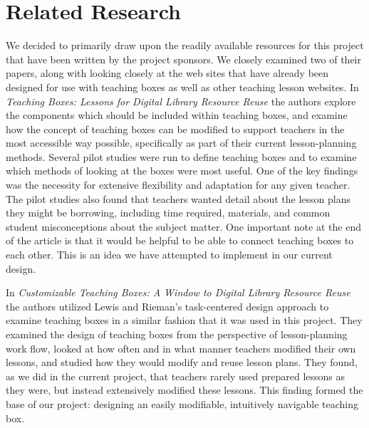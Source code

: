 \documentclass[10pt,letter]{article}
\begin{document}
\section{Related Research}
We decided to primarily draw upon the readily available resources for this
project that have been written by the project sponsors.  We closely examined two
of their papers, along with looking closely at the web sites that have already
been designed for use with teaching boxes as well as other teaching lesson
websites.  In \textit{Teaching Boxes: Lessons for Digital Library Resource
Reuse} \cite{bib:khan-maull} the authors explore the components which should be
included within teaching boxes, and examine how the concept of teaching boxes
can be modified to support teachers in the most accessible way possible,
specifically as part of their current lesson-planning methods.  Several pilot
studies were run to define teaching boxes and to examine which methods of
looking at the boxes were most useful.  One of the key findings was the
necessity for extensive flexibility and adaptation for any given teacher.  The
pilot studies also found that teachers wanted detail about the lesson plans they
might be borrowing, including time required, materials, and common student
misconceptions about the subject matter.  One important note at the end of the
article is that it would be helpful to be able to connect teaching boxes to each
other.  This is an idea we have attempted to implement in our current design.

In \textit{Customizable Teaching Boxes: A Window to Digital Library Resource
Reuse} \cite{bib:khan-maull2} the authors utilized Lewis and Rieman's
task-centered design approach to examine teaching boxes in a similar fashion
that it was used in this project.  They examined the design of teaching boxes
from the perspective of lesson-planning work flow, looked at how often and in
what manner teachers modified their own lessons, and studied how they would
modify and reuse lesson plans.  They found, as we did in the current project,
that teachers rarely used prepared lessons as they were, but instead extensively
modified these lessons.  This finding formed the base of our project: designing
an easily modifiable, intuitively navigable teaching box.
\end{document}
